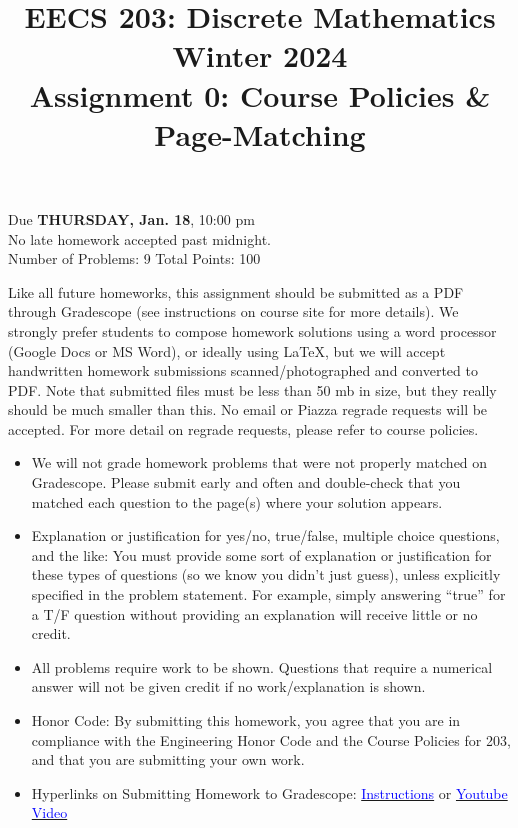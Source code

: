 \documentclass[12pt]{exam}
\begin{document}
\title{EECS 203: Discrete Mathematics\\
  Winter 2024\\
  Assignment 0: Course Policies \& Page-Matching}
\date{}
\author{}
\maketitle
\vspace{-50pt}
\begin{center}
  \huge Due \textbf{THURSDAY, Jan. 18}, 10:00 pm\\
\Large No late homework accepted past midnight.\\
\vspace{10pt}
\large Number of Problems: 9
\hspace{3cm}
Total Points: 100
\end{center}
\vspace{25pt}
Like all future homeworks, this assignment should be submitted as a PDF through Gradescope (see instructions on course site for more details). We strongly prefer students to compose homework solutions using a word processor (Google Docs or MS Word), or ideally using \LaTeX, but we will accept handwritten homework submissions scanned/photographed and converted to PDF. Note that submitted files must be less than 50 mb in size, but they really should be much smaller than this. No email or Piazza regrade requests will be accepted. For more detail on regrade requests, please refer to course policies.

\begin{itemize}
    \item We will not grade homework problems that were not properly matched on Gradescope. Please submit early and often and double-check that you matched each question to the page(s) where your solution appears.
    \item Explanation or justification for yes/no, true/false, multiple choice questions, and the like: You must provide some sort of explanation or justification for these types of questions (so we know you didn’t just guess), unless explicitly specified in the problem statement. For example, simply answering “true” for a T/F question without providing an explanation will receive little or no credit.
    \item All problems require work to be shown. Questions that require a numerical answer will not be given credit if no work/explanation is shown.
    \item Honor Code: By submitting this homework, you agree that you are in compliance with the Engineering Honor Code and the Course Policies for 203, and that you are submitting your own work.
    \item Hyperlinks on Submitting Homework to Gradescope: \href{https://www.gradescope.com/help#help-center-item-student-submitting}{\textcolor{blue}{Instructions}} or
    \href{https://youtu.be/KMPoby5g_nE}{\textcolor{blue}{Youtube Video}}
\end{itemize}
\newpage
\end{document}
